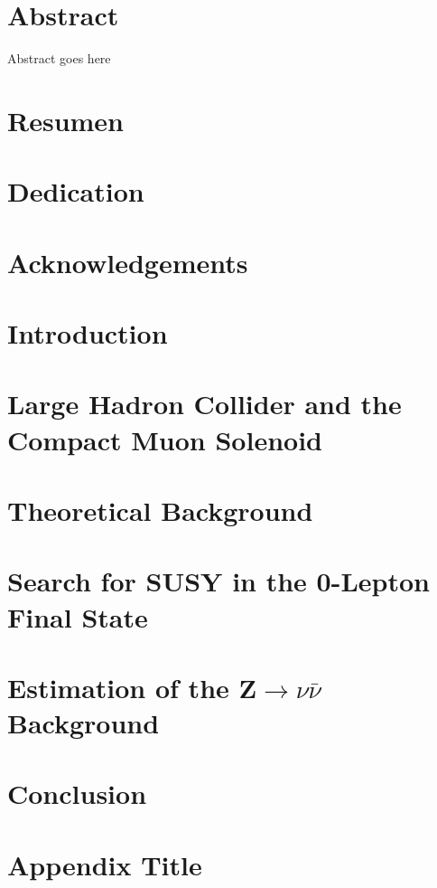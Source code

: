 \documentclass[12pt,twoside,openany]{book}
\begin{document}


\frontmatter
\chapter*{Abstract}
Abstract goes here
\chapter*{Resumen}
\chapter*{Dedication}
\chapter*{Acknowledgements}
\tableofcontents

\mainmatter
\chapter{Introduction}


\chapter{Large Hadron Collider and the Compact Muon Solenoid}


\chapter{Theoretical Background}


\chapter{Search for SUSY in the 0-Lepton Final State}\label{AnalysisChap}


\chapter{Estimation of the Z$\rightarrow \nu\bar{\nu}$ Background}


\chapter{Conclusion}


\appendix
\chapter{Appendix Title}


{}

\end{document}
